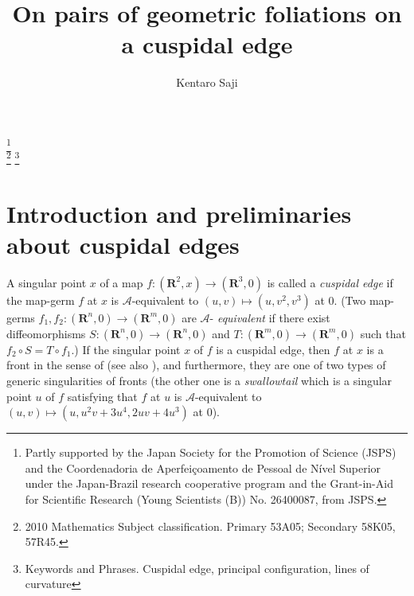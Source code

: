 \documentclass[a4paper, 12pt]{article}
\title[geometric foliations on a cuspidal edge]{On pairs of geometric foliations on a cuspidal edge}
\author[Kentaro Saji]{Kentaro Saji}
\theoremstyle{definition}
\numberwithin{equation}{section}
\begin{document}
{\ifx\TOUKOU{}\fi}

\footnote[0]{Partly supported by the
Japan Society for the Promotion of Science (JSPS)
and the
Coordenadoria de Aperfei\c{c}oamento de Pessoal de N\'ivel Superior
under the Japan-Brazil research cooperative
program and the
Grant-in-Aid for
Scientific Research (Young Scientists (B)) No. 26400087, from JSPS.}
\\[4mm]
\footnote[0]{ 2010 Mathematics Subject classification. 
Primary 53A05; Secondary 58K05, 57R45.}
\footnote[0]{Keywords and Phrases. Cuspidal edge, principal
configuration, lines of curvature}
\section{Introduction and preliminaries about cuspidal edges}
A singular point $x$ of a map $f:({\boldsymbol{R}}^2,x)\to({\boldsymbol{R}}^3,0)$ 
is called a {\it cuspidal edge\/}
if the map-germ $f$ at $x$ is $\mathcal{A}$-equivalent to
$(u,v)\mapsto(u,v^2,v^3)$ at $0$. (Two map-germs
$f_1,f_2:({\boldsymbol{R}}^n,0)\to({\boldsymbol{R}}^m,0)$ are $\mathcal{A}$-{\it
equivalent}\/ if there exist diffeomorphisms
$S:({\boldsymbol{R}}^n,0)\to({\boldsymbol{R}}^n,0)$ and $T:({\boldsymbol{R}}^m,0)\to({\boldsymbol{R}}^m,0)$ such
that $ f_2\circ S=T\circ f_1 $.) 
If the singular point $x$
of $f$ is a cuspidal edge, then $f$ at $x$ is a front
in the sense of \cite{AGV} (see also \cite{krsuy}), and
furthermore, they are one of two types of generic singularities of
fronts (the other one is a {\it swallowtail}\/ which is a singular
point $u$ of $f$ satisfying that $f$ at $u$ is
$\mathcal{A}$-equivalent to $(u,v)\mapsto(u, u^2v + 3u^4, 2 uv + 4
u^3)$ at $0$). 
\end{document}
